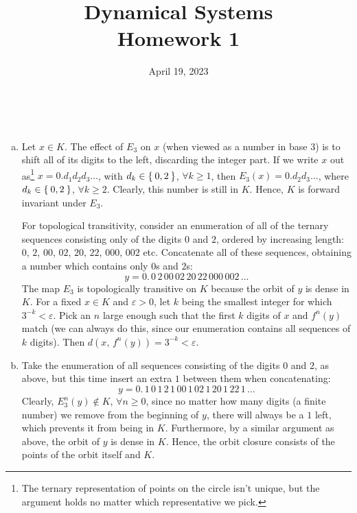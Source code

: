 \setcounter{problem}{0}

\title{Dynamical Systems \\ Homework 1}
\date{April 19, 2023}

\maketitle

\begin{problem}
~
\begin{enumerate}[a)]
    \item Let \(x \in K\). The effect of \(E_3\) on \(x\) (when viewed as a number in base \(3\)) is to shift all of its digits to the left, discarding the integer part. If we write \(x\) out as\footnote{The ternary representation of points on the circle isn't unique, but the argument holds no matter which representative we pick.} \(x = 0.d_1 d_2 d_3 \dots\), with \(d_k \in \Set{0, 2}\), \(\forall k \geq 1\), then \(E_3 (x) = 0.d_2 d_3 \dots\), where \(d_k \in \Set{0, 2}\), \(\forall k \geq 2\). Clearly, this number is still in \(K\). Hence, \(K\) is forward invariant under \(E_3\).

    For topological transitivity, consider an enumeration of all of the ternary sequences consisting only of the digits \(0\) and \(2\), ordered by increasing length: \(0\), \(2\), \(00\), \(02\), \(20\), \(22\), \(000\), \(002\) etc. Concatenate all of these sequences, obtaining a number which contains only \(0\)s and \(2\)s:
    \[
        y = 0. \, 0 \, 2 \, 00 \, 02 \, 20 \, 22 \, 000 \, 002 \, \dots
    \]
    The map \(E_3\) is topologically transitive on \(K\) because the orbit of \(y\) is dense in \(K\). For a fixed \(x \in K\) and \(\varepsilon > 0\), let \(k\) being the smallest integer for which \(3^{-k} < \varepsilon\). Pick an \(n\) large enough such that the first \(k\) digits of \(x\) and \(f^n(y)\) match (we can always do this, since our enumeration contains all sequences of \(k\) digits). Then \(d\left(x, \, f^n(y)\right) = 3^{-k} < \varepsilon\).

    \item Take the enumeration of all sequences consisting of the digits \(0\) and \(2\), as above, but this time insert an extra \(1\) between them when concatenating:
    \[
        y = 0. \, 1\, 0 \, 1 \, 2 \, 1 \, 00 \, 1 \, 02 \, 1 \, 20 \, 1 \, 22 \, 1 \, \dots
    \]
    Clearly, \(E_3^n (y) \not\in K\), \(\forall n \geq 0\), since no matter how many digits (a finite number) we remove from the beginning of \(y\), there will always be a \(1\) left, which prevents it from being in \(K\). Furthermore, by a similar argument as above, the orbit of \(y\) is dense in \(K\). Hence, the orbit closure consists of the points of the orbit itself and \(K\).


\end{enumerate}
\end{problem}
